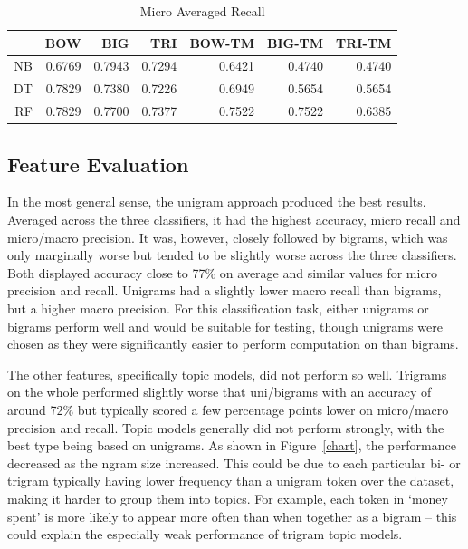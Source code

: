 \documentclass[11pt]{article}
\begin{document}
\begin{table}[htbp]
  \centering
  \caption{Micro Averaged Recall}
    \begin{tabular}{r|rrrrrr}
    \toprule
          & BOW   & BIG   & TRI   & BOW-TM & BIG-TM & TRI-TM \\
    \midrule
    NB    & 0.6769 & 0.7943 & 0.7294 & 0.6421 & 0.4740 & 0.4740 \\
    DT    & 0.7829 & 0.7380 & 0.7226 & 0.6949 & 0.5654 & 0.5654 \\
    RF    & 0.7829 & 0.7700 & 0.7377 & 0.7522 & 0.7522 & 0.6385 \\
    \bottomrule
    \end{tabular}%
  \label{tab:mir}%
\end{table}%

\subsection{Feature Evaluation}
In the most general sense, the unigram approach produced the best results. Averaged across the three classifiers, it had the highest accuracy, micro recall and micro/macro precision. It was, however, closely followed by bigrams, which was only marginally worse but tended to be slightly worse across the three classifiers. Both displayed accuracy close to 77\% on average and similar values for micro precision and recall. Unigrams had a slightly lower macro recall than bigrams, but a higher macro precision. For this classification task, either unigrams or bigrams perform well and would be suitable for testing, though unigrams were chosen as they were significantly easier to perform computation on than bigrams.

The other features, specifically topic models, did not perform so well. Trigrams on the whole performed slightly worse that uni/bigrams with an accuracy of around 72\% but typically scored a few percentage points lower on micro/macro precision and recall. Topic models generally did not perform strongly, with the best type being based on unigrams. As shown in Figure~\ref{chart}, the performance decreased as the ngram size increased. This could be due to each particular bi- or trigram typically having lower frequency than a unigram token over the dataset, making it harder to group them into topics. For example, each token in `money spent' is more likely to appear more often than when together as a bigram – this could explain the especially weak performance of trigram topic models.
\end{document}
